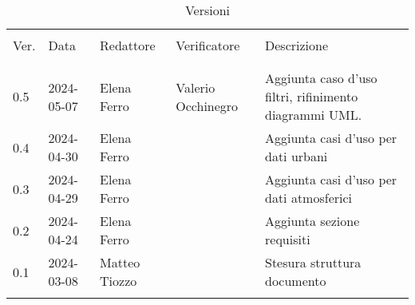 \documentclass[12pt]{article}
\begin{document}


\newpage



\captionsetup[table]{list=no}
\begin{table}[!h]
	\footnotesize
	\begin{center}
		\caption*{Versioni}
		\vspace{0.5cm}
		\begin{tabular}{ l l l l p{6.1cm} }
			\hline                                                                                                    \\[-2ex]
			Ver. & Data       & Redattore     & Verificatore       & Descrizione                                            \\
			\\[-2ex] \hline \\[-1.5ex]
			0.5  & 2024-05-07 & Elena Ferro   & Valerio Occhinegro & Aggiunta caso d'uso filtri, rifinimento diagrammi UML. \\
			0.4  & 2024-04-30 & Elena Ferro   &             	   & Aggiunta casi d'uso per dati urbani                    \\
			0.3  & 2024-04-29 & Elena Ferro   &             	   & Aggiunta casi d'uso per dati atmosferici               \\
			0.2  & 2024-04-24 & Elena Ferro   &             	   & Aggiunta sezione requisiti                             \\
			0.1  & 2024-03-08 & Matteo Tiozzo &             	   & Stesura struttura documento                            \\
			\\[-1.5ex] \hline
		\end{tabular}
	\end{center}
\end{table}
\captionsetup[table]{list=yes}

\newpage

\tableofcontents
\listoftables
\listoffigures

\newpage








\end{document}
